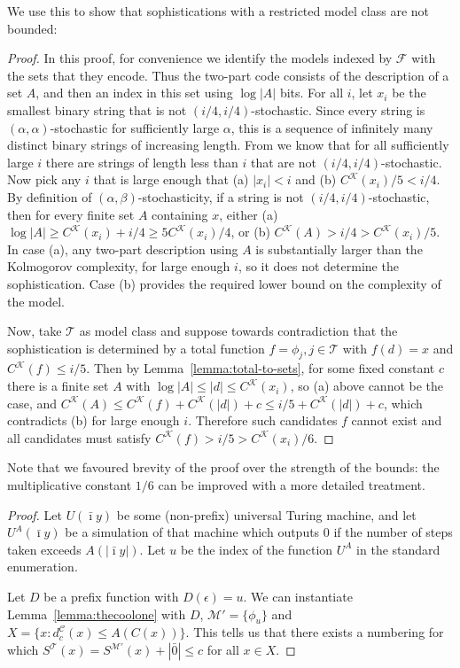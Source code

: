 \documentclass{style/llncs}
\newcommand{\M}{\mathscr M}
\newcommand{\C}{\mathscr C}
\newcommand{\T}{\mathscr T}
\newcommand{\F}{\mathscr F}
\newcommand{\K}{\mathscr K}
\newcommand{\s}{S}
\begin{document}
We use this to show that sophistications with a restricted model class are not bounded:
\dogfood*
\begin{proof}
In this proof, for convenience we identify the models indexed by $\F$ with the sets that they encode. Thus the two-part code consists of the description of a set $A$, and then an index in this set using $\log|A|$ bits.
For all $i$, let $x_i$ be the smallest binary string that is not $(i/4, i/4)$-stochastic. Since every string is $(\alpha,\alpha)$-stochastic for sufficiently large $\alpha$, this is a sequence of infinitely many distinct binary strings of increasing length. From \cite[Proposition~I.3 (b)]{gacs2001algorithmic} we know that for all sufficiently large $i$ there are strings of length less than $i$ that are not $(i/4, i/4)$-stochastic. Now pick any $i$ that is large enough that (a) $|x_i|<i$ and (b) $C^\K(x_i)/5 < i/4$. By definition of $(\alpha,\beta)$-stochasticity, if a string is not $(i/4,i/4)$-stochastic, then for every finite set $A$ containing $x$, either (a) $\log|A|\ge C^\K(x_i)+i/4\ge 5C^\K(x_i)/4$, or (b) $C^\K(A)>i/4>C^\K(x_i)/5$.
In case (a), any two-part description using $A$ is substantially larger than the Kolmogorov complexity, for large enough $i$, so it does not determine the sophistication. Case (b) provides the required lower bound on the complexity of the model.

Now, take $\T$ as model class and suppose towards contradiction that the sophistication is determined by a total function $f=\phi_j,j\in\T$ with $f(d)=x$ and $C^\K(f)\le i/5$. Then by Lemma~\ref{lemma:total-to-sets}, for some fixed constant $c$ there is a finite set $A$ with $\log|A|\le|d|\le C^\K(x_i)$, so (a) above cannot be the case, and $C^\K(A)\le C^\K(f)+C^\K(|d|)+c\le i/5+C^\K(|d|)+c$, which contradicts (b) for large enough $i$. Therefore such candidates $f$ cannot exist and all candidates must satisfy $C^\K(f)>i/5>C^\K(x_i)/6$.
\end{proof}

Note that we favoured brevity of the proof over the strength of the bounds: the multiplicative constant $1/6$ can be improved with a more detailed treatment.

\depth*
\begin{proof}
Let $U(\bar\imath y)$ be some (non-prefix) universal Turing machine, and let $U^A(\bar\imath y)$ be a simulation of that machine which outputs $0$ if the number of steps taken exceeds $A(|\bar\imath y|)$. Let $u$ be the index of the function $U^A$ in the standard enumeration.

Let $D$ be a prefix function with $D(\epsilon) = u$. We can instantiate Lemma~\ref{lemma:thecoolone} with $D$, $\M' = \{\phi_u\}$ and $X = \{x : d^\C_c(x) \leq A(C(x))\}$. This tells us that there exists a numbering for which $\s^\T(x) = \s^{\M'}(x) + |\bar0| \leq c$ for all $x \in X$.
\end{proof}
\end{document}
